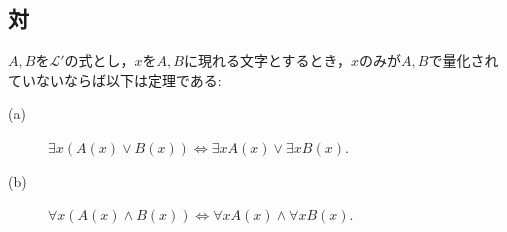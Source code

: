 \subsection{対}
	\begin{screen}
		\begin{metathm}[量化記号の性質(ロ)]\label{metathm:properties_of_quantifiers_2}
			$A,B$を$\mathcal{L}'$の式とし，$x$を$A,B$に現れる文字とするとき，$x$のみが$A,B$で量化されていないならば以下は定理である:
			\begin{description}
				\item[(a)] $\exists x ( A(x) \vee B(x) ) \Longleftrightarrow \exists x A(x) \vee \exists x B(x)$.
				
				\item[(b)] $\forall x ( A(x) \wedge B(x) ) \Longleftrightarrow \forall x A(x) \wedge \forall x B(x)$.
			\end{description}
		\end{metathm}
	\end{screen}
	
